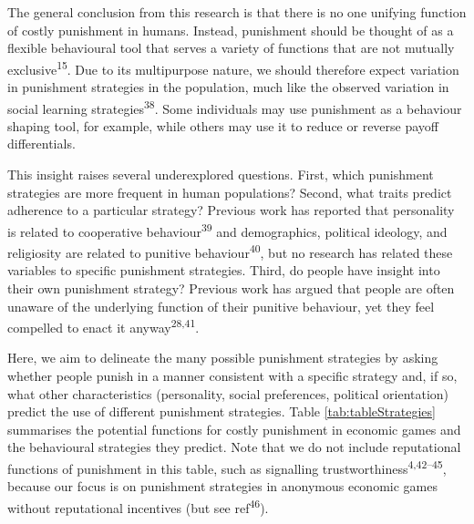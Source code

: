 \documentclass[
  man,floatsintext]{apa6}
\begin{document}
The general conclusion from this research is that there is no one unifying function of costly punishment in humans. Instead, punishment should be thought of as a flexible behavioural tool that serves a variety of functions that are not mutually exclusive\textsuperscript{15}. Due to its multipurpose nature, we should therefore expect variation in punishment strategies in the population, much like the observed variation in social learning strategies\textsuperscript{38}. Some individuals may use punishment as a behaviour shaping tool, for example, while others may use it to reduce or reverse payoff differentials.

This insight raises several underexplored questions. First, which punishment strategies are more frequent in human populations? Second, what traits predict adherence to a particular strategy? Previous work has reported that personality is related to cooperative behaviour\textsuperscript{39} and demographics, political ideology, and religiosity are related to punitive behaviour\textsuperscript{40}, but no research has related these variables to specific punishment strategies. Third, do people have insight into their own punishment strategy? Previous work has argued that people are often unaware of the underlying function of their punitive behaviour, yet they feel compelled to enact it anyway\textsuperscript{28,41}.

Here, we aim to delineate the many possible punishment strategies by asking whether people punish in a manner consistent with a specific strategy and, if so, what other characteristics (personality, social preferences, political orientation) predict the use of different punishment strategies. Table \ref{tab:tableStrategies} summarises the potential functions for costly punishment in economic games and the behavioural strategies they predict. Note that we do not include reputational functions of punishment in this table, such as signalling trustworthiness\textsuperscript{4,42--45}, because our focus is on punishment strategies in anonymous economic games without reputational incentives (but see ref\textsuperscript{46}).
\end{document}
